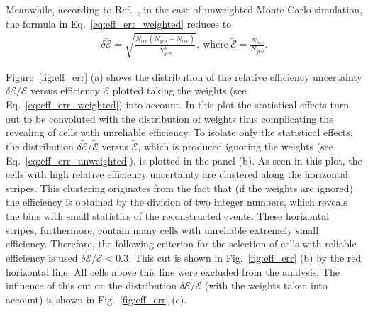 Meanwhile, according to Ref.~\cite{Laforge:1996ts}, in the case of unweighted Monte Carlo simulation, the formula in Eq.~\eqref{eq:eff_err_weighted} reduces to
\begin{equation}
\begin{aligned}
\delta \widetilde{\mathcal{E}} = \sqrt{\frac{N_{rec}(N_{gen} - N_{rec})}{N_{gen}^{3}}},~\textrm{where}~\widetilde{\mathcal{E}} = \frac{N_{rec}}{N_{gen}}.
\end{aligned}
\label{eq:eff_err_unweighted}
\end{equation}

Figure~\ref{fig:eff_err} (a) shows the distribution of the relative efficiency uncertainty $\delta \mathcal{E}/\mathcal{E}$ versus efficiency $\mathcal{E}$ plotted taking the weights (see Eq.~\eqref{eq:eff_err_weighted}) into account. In this plot the statistical effects turn out to be convoluted with the distribution of weights thus complicating the revealing of cells with unreliable efficiency. To isolate only the statistical effects, the distribution $\delta \widetilde{\mathcal{E}}/\widetilde{\mathcal{E}}$ versus $\widetilde{\mathcal{E}}$, which is produced ignoring the weights (see Eq.~\eqref{eq:eff_err_unweighted}), is plotted in the panel (b). As seen in this plot, the cells with high relative efficiency uncertainty are clustered along the horizontal stripes. This clustering originates from the fact that (if the weights are ignored) the efficiency is obtained by the division of two integer numbers, which reveals the bins with small statistics of the  reconstructed events. These horizontal stripes, furthermore, contain many cells with unreliable extremely small efficiency. Therefore, the following criterion for the selection of cells with reliable efficiency is used $\delta \widetilde{\mathcal{E}}/\widetilde{\mathcal{E}} < 0.3$. This cut is shown in Fig.~\ref{fig:eff_err} (b) by the red horizontal line. All cells above this line were excluded from the analysis. The influence of this cut on the distribution $\delta \mathcal{E}/\mathcal{E}$ (with the weights taken into account) is shown in Fig.~\ref{fig:eff_err} (c).


